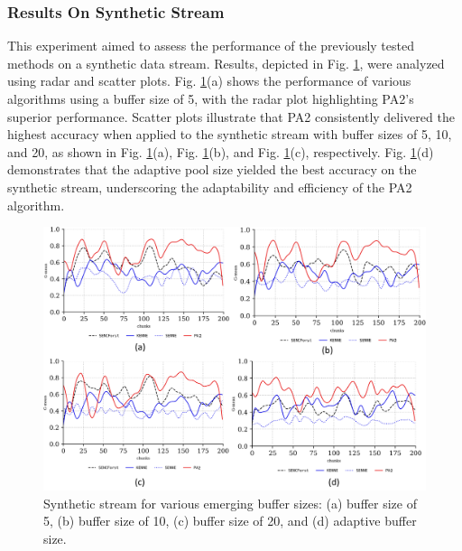 \subsubsection{Results On Synthetic Stream}
\label{sec:synthetic}
This experiment aimed to assess the performance of the previously tested methods on a synthetic data stream. Results, depicted in Fig. \ref{fig:res3}, were analyzed using radar and scatter plots. Fig. \ref{fig:res3}(a) shows the performance of various algorithms using a buffer size of 5, with the radar plot highlighting PA2's superior performance. Scatter plots illustrate that PA2 consistently delivered the highest accuracy when applied to the synthetic stream with buffer sizes of 5, 10, and 20, as shown in Fig. \ref{fig:res3}(a), Fig. \ref{fig:res3}(b), and Fig. \ref{fig:res3}(c), respectively. Fig. \ref{fig:res3}(d) demonstrates that the adaptive pool size yielded the best accuracy on the synthetic stream, underscoring the adaptability and efficiency of the PA2 algorithm.

\begin{figure}[!ht]
	\centering
	\includegraphics[width=1\linewidth]{5_Emerging/images/res3.png}
	\caption{Synthetic stream for various emerging buffer sizes: (a) buffer size of 5, (b) buffer size of 10, (c) buffer size of 20, and (d) adaptive buffer size.}

	\label{fig:res3}
\end{figure}				

